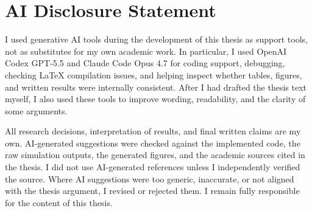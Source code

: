 \section*{AI Disclosure Statement}

I used generative AI tools during the development of this thesis as support tools, not as substitutes for my own academic work. In particular, I used OpenAI Codex GPT-5.5 and Claude Code Opus 4.7 for coding support, debugging, checking LaTeX compilation issues, and helping inspect whether tables, figures, and written results were internally consistent. After I had drafted the thesis text myself, I also used these tools to improve wording, readability, and the clarity of some arguments.

All research decisions, interpretation of results, and final written claims are my own. AI-generated suggestions were checked against the implemented code, the raw simulation outputs, the generated figures, and the academic sources cited in the thesis. I did not use AI-generated references unless I independently verified the source. Where AI suggestions were too generic, inaccurate, or not aligned with the thesis argument, I revised or rejected them. I remain fully responsible for the content of this thesis.
